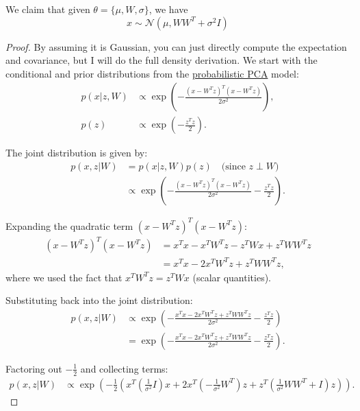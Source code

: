   \begin{lemma}
    \label{thm:marginal-distribution-of-ppca}
 
    We claim that given $\theta = \{\mu, W, \sigma\}$, we have 
    \begin{equation}
      x \sim \mathcal{N}(\mu, W W^T + \sigma^2 I) 
    \end{equation} 
  \end{lemma}
  \begin{proof}
    By assuming it is Gaussian, you can just directly compute the expectation and covariance, but I will do the full density derivation. We start with the conditional and prior distributions from the \hyperref[def:probabilistic-pca]{probabilistic PCA} model:
    \begin{align}
      p(x | z, W) &\propto \exp\left(-\frac{(x - W^T z)^T(x - W^T z)}{2\sigma^2}\right), \\
      p(z) &\propto \exp\left(-\frac{z^T z}{2}\right).
    \end{align}

    The joint distribution is given by:
    \begin{align}
      p(x, z | W) &= p(x | z, W)p(z) \quad \text{(since } z \perp W\text{)} \\
      &\propto \exp\left(-\frac{(x - W^T z)^T(x - W^T z)}{2\sigma^2} - \frac{z^T z}{2}\right).
    \end{align}

    Expanding the quadratic term $(x - W^T z)^T(x - W^T z)$:
    \begin{align}
      (x - W^T z)^T(x - W^T z) &= x^T x - x^T W^T z - z^T W x + z^T W W^T z \\
      &= x^T x - 2x^T W^T z + z^T W W^T z,
    \end{align}
    where we used the fact that $x^T W^T z = z^T W x$ (scalar quantities).

    Substituting back into the joint distribution:
    \begin{align}
      p(x, z | W) &\propto \exp\left(-\frac{x^T x - 2x^T W^T z + z^T W W^T z}{2\sigma^2} - \frac{z^T z}{2}\right) \\
      &= \exp\left(-\frac{x^T x - 2x^T W^T z + z^T W W^T z}{2\sigma^2} - \frac{z^T z}{2}\right).
    \end{align}

    Factoring out $-\frac{1}{2}$ and collecting terms:
    \begin{align}
      p(x, z | W) &\propto \exp\left(-\frac{1}{2}\left(x^T\left(\frac{1}{\sigma^2}I\right)x + 2x^T\left(-\frac{1}{\sigma^2}W^T\right)z + z^T\left(\frac{1}{\sigma^2}WW^T + I\right)z\right)\right).
    \end{align}


\end{proof}
